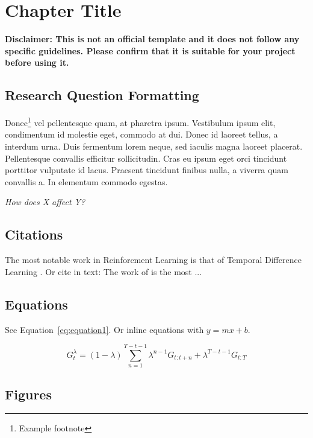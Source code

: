 \chapter[Alternate Heading Title]{Chapter Title}

\textbf{Disclaimer: This is not an official template and it does not follow any specific guidelines. Please confirm that it is suitable for your project before using it.}

\section{Research Question Formatting}

Donec\footnote{Example footnote} vel pellentesque quam, at pharetra ipsum. Vestibulum ipsum elit, condimentum id molestie eget, commodo at dui. Donec id laoreet tellus, a interdum urna. Duis fermentum lorem neque, sed iaculis magna laoreet placerat. Pellentesque convallis efficitur sollicitudin. Cras eu ipsum eget orci tincidunt porttitor vulputate id lacus. Praesent tincidunt finibus nulla, a viverra quam convallis a. In elementum commodo egestas.

\begin{center}
    \textit{How does X affect Y?}
\end{center}

\section{Citations}

The most notable work in Reinforcment Learning is that of Temporal Difference Learning \autocite{sutton_learning_1988}. Or cite in text: The work of \textcite{sutton_learning_1988} is the most ...

\section{Equations}

See Equation~\ref{eq:equation1}. Or inline equations with $y = mx + b$.

\begin{equation}
    G_t^\lambda = (1-\lambda) \sum_{n=1}^{T-t-1} \lambda^{n-1} G_{t:t+n} + \lambda^{T-t-1} G_{t:T}
    \label{eq:equation1}
\end{equation}

\clearpage

\section{Figures}

